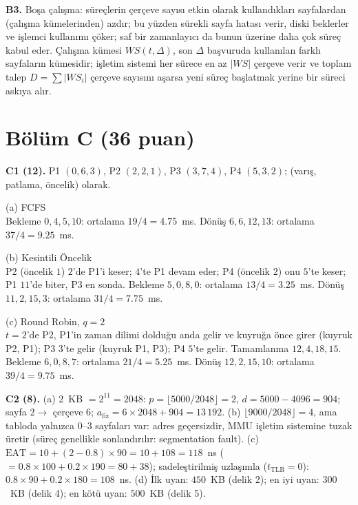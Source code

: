 \textbf{B3.} Boşa çalışma: süreçlerin çerçeve sayısı etkin olarak kullandıkları sayfalardan (çalışma kümelerinden) azdır; bu yüzden sürekli sayfa hatası verir, diski beklerler ve işlemci kullanımı çöker; saf bir zamanlayıcı da bunun üzerine daha çok süreç kabul eder. Çalışma kümesi $WS(t,\Delta)$, son $\Delta$ başvuruda kullanılan farklı sayfaların kümesidir; işletim sistemi her sürece en az $|WS|$ çerçeve verir ve toplam talep $D = \sum |WS_i|$ çerçeve sayısını aşarsa yeni süreç başlatmak yerine bir süreci askıya alır.

\section*{Bölüm C (36 puan)}
\textbf{C1 (12).} P1 $(0, 6, 3)$, P2 $(2, 2, 1)$, P3 $(3, 7, 4)$, P4 $(5, 3, 2)$; (varış, patlama, öncelik) olarak.

(a) FCFS\quad{}\\
Bekleme $0, 4, 5, 10$: ortalama $19/4 = 4.75$~ms. Dönüş $6, 6, 12, 13$: ortalama $37/4 = 9.25$~ms.

(b) Kesintili Öncelik\quad{}\\
P2 (öncelik $1$) $2$'de P1'i keser; $4$'te P1 devam eder; P4 (öncelik $2$) onu $5$'te keser; P1 $11$'de biter, P3 en sonda. Bekleme $5, 0, 8, 0$: ortalama $13/4 = 3.25$~ms. Dönüş $11, 2, 15, 3$: ortalama $31/4 = 7.75$~ms.

(c) Round Robin, $q=2$\quad{}\\
$t=2$'de P2, P1'in zaman dilimi dolduğu anda gelir ve kuyruğa önce girer (kuyruk P2, P1); P3 $3$'te gelir (kuyruk P1, P3); P4 $5$'te gelir. Tamamlanma $12, 4, 18, 15$. Bekleme $6, 0, 8, 7$: ortalama $21/4 = 5.25$~ms. Dönüş $12, 2, 15, 10$: ortalama $39/4 = 9.75$~ms.

\textbf{C2 (8).} (a) $2$~KB $= 2^{11} = 2048$: $p = \lfloor 5000/2048 \rfloor = 2$, $d = 5000 - 4096 = 904$; sayfa $2 \to$ çerçeve $6$; $a_{\text{fiz}} = 6 \times 2048 + 904 = 13\,192$. (b) $\lfloor 9000/2048 \rfloor = 4$, ama tabloda yalnızca $0$--$3$ sayfaları var: adres geçersizdir, MMU işletim sistemine tuzak üretir (süreç genellikle sonlandırılır: segmentation fault). (c) $\text{EAT} = 10 + (2 - 0.8) \times 90 = 10 + 108 = 118$~ns ($= 0.8 \times 100 + 0.2 \times 190 = 80 + 38$); sadeleştirilmiş uzlaşımla ($t_{\text{TLB}}=0$): $0.8 \times 90 + 0.2 \times 180 = 108$~ns. (d) İlk uyan: $450$~KB (delik 2); en iyi uyan: $300$~KB (delik 4); en kötü uyan: $500$~KB (delik 5).


